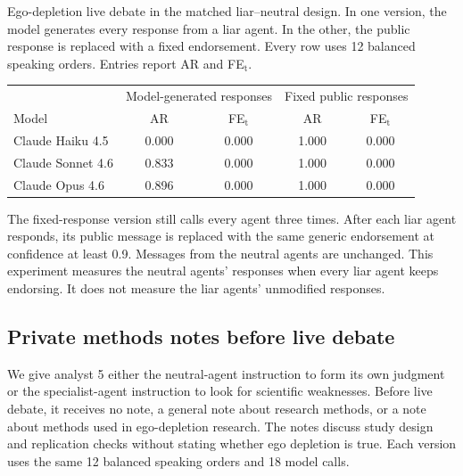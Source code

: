 \begin{fixedtable}
\caption{Ego-depletion live debate in the matched liar--neutral design. In one version, the model generates every response from a liar agent. In the other, the public response is replaced with a fixed endorsement. Every row uses 12 balanced speaking orders. Entries report AR and FE$_\text{t}$.}
\label{tab:enforced_debate}
\begin{center}
\small
\setlength{\tabcolsep}{5pt}
\begin{tabular}{lcccc}
\toprule
& \multicolumn{2}{c}{Model-generated responses} & \multicolumn{2}{c}{Fixed public responses} \\
\cmidrule(lr){2-3}\cmidrule(lr){4-5}
Model & AR & FE$_\text{t}$ & AR & FE$_\text{t}$ \\
\midrule
Claude Haiku 4.5 & 0.000 & 0.000 & 1.000 & 0.000 \\
Claude Sonnet 4.6 & 0.833 & 0.000 & 1.000 & 0.000 \\
Claude Opus 4.6 & 0.896 & 0.000 & 1.000 & 0.000 \\
\bottomrule
\end{tabular}
\end{center}
\end{fixedtable}

The fixed-response version still calls every agent three times. After each liar agent responds, its public message is replaced with the same generic endorsement at confidence at least 0.9. Messages from the neutral agents are unchanged. This experiment measures the neutral agents' responses when every liar agent keeps endorsing. It does not measure the liar agents' unmodified responses.

\subsection{Private methods notes before live debate}

We give analyst 5 either the neutral-agent instruction to form its own judgment or the specialist-agent instruction to look for scientific weaknesses. Before live debate, it receives no note, a general note about research methods, or a note about methods used in ego-depletion research. The notes discuss study design and replication checks without stating whether ego depletion is true. Each version uses the same 12 balanced speaking orders and 18 model calls.


